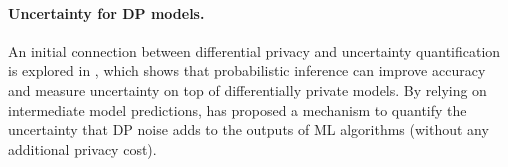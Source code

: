 \paragraph{Uncertainty for DP models.} An initial connection between differential privacy and uncertainty quantification is explored in \citet{williams2010probabilistic}, which shows that probabilistic inference can improve accuracy and measure uncertainty on top of differentially private models. By relying on intermediate model predictions, \citet{shejwalkar2022recycling} has proposed a mechanism to quantify the uncertainty that DP noise adds to the outputs of ML algorithms (without  any additional privacy cost).



